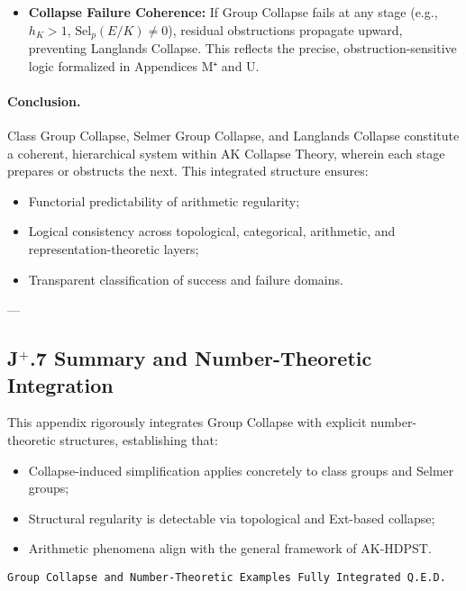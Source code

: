 \documentclass[11pt]{article}
\begin{document}
\begin{itemize}
    \item \textbf{Collapse Failure Coherence:}  
    If Group Collapse fails at any stage (e.g., \( h_K > 1 \), \( \mathrm{Sel}_p(E/K) \neq 0 \)), residual obstructions propagate upward, preventing Langlands Collapse. This reflects the precise, obstruction-sensitive logic formalized in Appendices M⁺ and U.

\end{itemize}

\paragraph{Conclusion.}  
Class Group Collapse, Selmer Group Collapse, and Langlands Collapse constitute a coherent, hierarchical system within AK Collapse Theory, wherein each stage prepares or obstructs the next. This integrated structure ensures:

\begin{itemize}
    \item Functorial predictability of arithmetic regularity;
    \item Logical consistency across topological, categorical, arithmetic, and representation-theoretic layers;
    \item Transparent classification of success and failure domains.
\end{itemize}

---

\subsection*{J$^{+}$.7 Summary and Number-Theoretic Integration}

This appendix rigorously integrates Group Collapse with explicit number-theoretic structures, establishing that:

\begin{itemize}
    \item Collapse-induced simplification applies concretely to class groups and Selmer groups;
    \item Structural regularity is detectable via topological and Ext-based collapse;
    \item Arithmetic phenomena align with the general framework of AK-HDPST.
\end{itemize}

\begin{flushright}
\texttt{Group Collapse and Number-Theoretic Examples \quad Fully Integrated \quad Q.E.D.}
\end{flushright}
\end{document}
